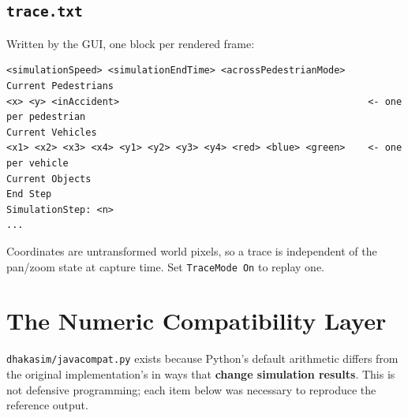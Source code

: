 \documentclass[11pt, a4paper]{article}
\newcommand{\code}[1]{\texttt{#1}}
\begin{document}
\subsection{\code{trace.txt}}

Written by the GUI, one block per rendered frame:

\begin{lstlisting}[caption=trace.txt structure]
<simulationSpeed> <simulationEndTime> <acrossPedestrianMode>
Current Pedestrians
<x> <y> <inAccident>                                            <- one per pedestrian
Current Vehicles
<x1> <x2> <x3> <x4> <y1> <y2> <y3> <y4> <red> <blue> <green>    <- one per vehicle
Current Objects
End Step
SimulationStep: <n>
...
\end{lstlisting}

Coordinates are untransformed world pixels, so a trace is independent of the
pan/zoom state at capture time. Set \code{TraceMode On} to replay one.

\section{The Numeric Compatibility Layer}
\label{sec:compat}

\code{dhakasim/javacompat.py} exists because Python's default arithmetic differs
from the original implementation's in ways that \textbf{change simulation
results}. This is not defensive programming; each item below was necessary to
reproduce the reference output.
\end{document}
